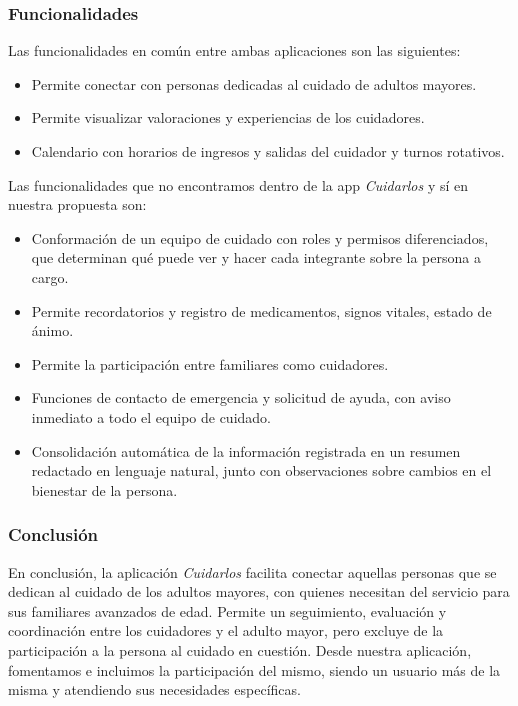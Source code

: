 \documentclass[a4paper,12pt]{article}
\begin{document}
    \subsubsection{Funcionalidades}
    \par Las funcionalidades en común entre ambas aplicaciones son las siguientes:
    \begin{itemize}
        \item Permite conectar con personas dedicadas al cuidado de adultos mayores.
        \item Permite visualizar valoraciones y experiencias de los cuidadores.
        \item Calendario con horarios de ingresos y salidas del cuidador y turnos rotativos.
    \end{itemize}
    \par Las funcionalidades que no encontramos dentro de la app \textit{Cuidarlos} y sí en nuestra propuesta son:
    \begin{itemize}
        \item Conformación de un equipo de cuidado con roles y permisos diferenciados, que determinan qué puede ver y hacer cada integrante sobre la persona a cargo.
        \item Permite recordatorios y registro de medicamentos, signos vitales, estado de ánimo.
        \item Permite la participación entre familiares como cuidadores.
        \item Funciones de contacto de emergencia y solicitud de ayuda, con aviso inmediato a todo el equipo de cuidado.
        \item Consolidación automática de la información registrada en un resumen redactado en lenguaje natural, junto con observaciones sobre cambios en el bienestar de la persona.
    \end{itemize}
    \subsubsection{Conclusión}
    \par En conclusión, la aplicación \textit{Cuidarlos} facilita conectar aquellas personas que se dedican al cuidado de los adultos mayores, con quienes necesitan del servicio para sus familiares avanzados de edad. Permite un seguimiento, evaluación y coordinación entre los cuidadores y el adulto mayor, pero excluye de la participación a la persona al cuidado en cuestión. Desde nuestra aplicación, fomentamos e incluimos la participación del mismo, siendo un usuario más de la misma y atendiendo sus necesidades específicas.
\end{document}
